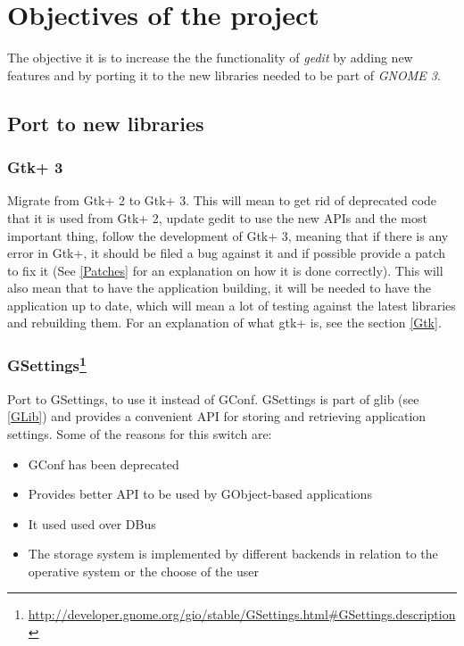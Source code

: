 
\chapter{Objectives of the project}


The objective it is to increase the the functionality of \emph{gedit} by adding new features and by porting it to the new libraries needed to be part of \emph{GNOME 3}.

\section{Port to new libraries}\label{NewLibraries}

\subsection{Gtk+ 3}\label{Gtk3}

Migrate from Gtk+ 2 to Gtk+ 3. This will mean to get rid of deprecated code that it is used from Gtk+ 2, update gedit to use the new APIs and the most important thing, follow the development of Gtk+ 3, meaning that if there is any error in Gtk+, it should be filed a bug against it and if possible provide a patch to fix it (See \ref{Patches} for an explanation on how it is done correctly). This will also mean that to have the application building, it will be needed to have the application up to date, which will mean a lot of testing against the latest libraries and rebuilding them. For an explanation of what gtk+ is, see the section \ref{Gtk}.

\subsection[GSettings]{GSettings\footnote{\url{http://developer.gnome.org/gio/stable/GSettings.html\#GSettings.description}}}\label{GSettings}

Port to GSettings, to use it instead of GConf. GSettings is part of glib (see \ref{GLib}) and provides a convenient API for storing and retrieving application settings. Some of the reasons for this switch are:
\begin{itemize}
  \item GConf has been deprecated
  \item Provides better API to be used by GObject-based applications
  \item It used used over DBus
  \item The storage system is implemented by different backends in relation to the operative system or the choose of the user
\end{itemize}

